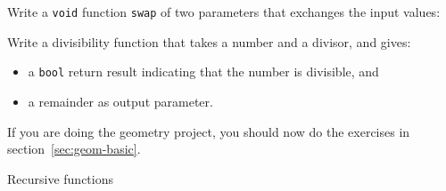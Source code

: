 \begin{exercise}
  \label{ex:swap}
  Write a \lstinline{void} function \lstinline{swap} of two parameters that
  exchanges the input values:
\end{exercise}

\begin{exercise}
  \label{ex:div-remain}
  Write a divisibility function that takes a number and a divisor, and gives:
  \begin{itemize}
  \item a \lstinline{bool} return result indicating that the number is
    divisible, and
  \item a remainder as output parameter.
  \end{itemize}
\end{exercise}

\begin{exercise}
  \label{ex:geom-basic}
  If you are doing the geometry project, you should now do the exercises
  in section~\ref{sec:geom-basic}.
\end{exercise}

 {Recursive functions}
\label{sec:recursion}

